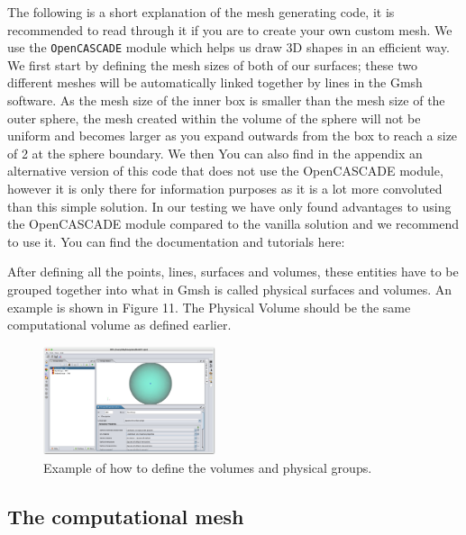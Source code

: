 \documentclass[a4paper, 11pt]{article}
\begin{document}
The following is a short explanation of the mesh generating code, it is recommended to read through it if you are to create your own custom mesh. We use the \verb|OpenCASCADE| module which helps us draw 3D shapes in an efficient way. We first start by defining the mesh sizes of both of our surfaces; these two different meshes will be automatically linked together by lines in the Gmsh software. As the mesh size of the inner box is smaller than the mesh size of the outer sphere, the mesh created within the volume of the sphere will not be uniform and becomes larger as you expand outwards from the box to reach a size of 2 at the sphere boundary. We then 
You can also find in the appendix an alternative version of this code that does not use the OpenCASCADE module, however it is only there for information purposes as it is a lot more convoluted than this simple solution. In our testing we have only found advantages to using the OpenCASCADE module compared to the vanilla solution and we recommend to use it. You can find the documentation and tutorials here:

After defining all the points, lines, surfaces and volumes, these entities have to be grouped together into what in Gmsh is called physical surfaces and volumes. An example is shown in Figure 11. The Physical Volume should be the same computational volume as defined earlier.

\begin{figure}[!ht]
    \centering
    \includegraphics[width=0.45\textwidth]{fig11.jpg}
    \caption{Example of how to define the volumes and physical groups.}
\end{figure}

\subsection{The computational mesh}
\end{document}
